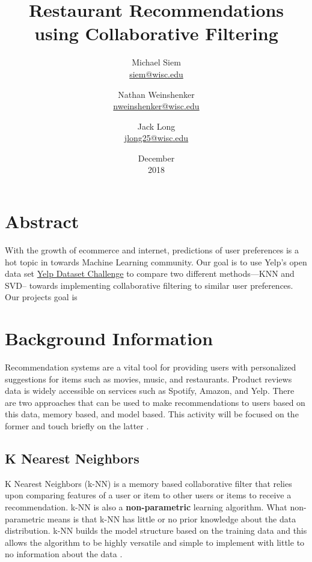 \documentclass{report}
\title{Restaurant Recommendations using Collaborative Filtering}
\date{December\\ 2018}
\author{Michael Siem \\ \href{mailto:siem@wisc.edu}{siem@wisc.edu}
	\and Nathan Weinshenker \\ \href{mailto:nweinshenker@wisc.edu}{nweinshenker@wisc.edu}
	\and Jack Long \\ \href{mailto:jlong25@wisc.edu}{jlong25@wisc.edu}}
\begin{document}
\maketitle

\section*{Abstract}
With the growth of ecommerce and internet, predictions of user preferences is a hot topic in towards Machine Learning community. Our goal is to use Yelp's open data set \href {https://www.yelp.com/dataset/challenge} {Yelp Dataset Challenge} to compare two different methods—KNN and SVD-- towards implementing collaborative filtering to similar user preferences.  Our projects goal is 


\section*{Background Information}

Recommendation systems are a vital tool for providing users with personalized suggestions for items such as movies, music, and restaurants.
Product reviews data is widely accessible on services such as Spotify, Amazon, and Yelp.
There are two approaches that can be used to make recommendations to users based on this data, memory based, and model based. This activity will be focused on the former and touch briefly on the latter \cite{5}.
\newline

	
\subsection*{K Nearest Neighbors}
	
K Nearest Neighbors (k-NN) is a memory based collaborative filter that relies upon comparing features of a user or item to other users or items to receive a recommendation. 
k-NN is also a \textbf{non-parametric} learning algorithm. What non-parametric means is that k-NN has little or no prior knowledge about the data distribution. k-NN  builds the model structure based on the training data and this allows the algorithm to be highly versatile and simple to implement with little to no information about the data \cite{3}. 
\end{document}
